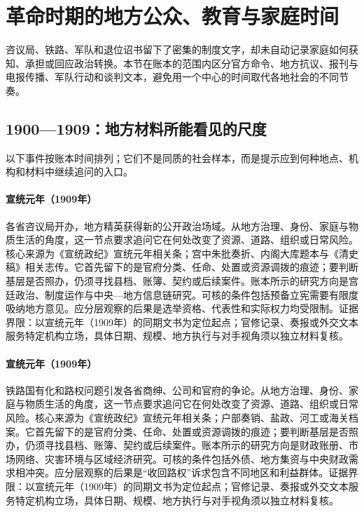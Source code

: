 \section{革命时期的地方公众、教育与家庭时间}
咨议局、铁路、军队和退位诏书留下了密集的制度文字，却未自动记录家庭如何获知、承担或回应政治转换。本节在账本的范围内区分官方命令、地方抗议、报刊与电报传播、军队行动和谈判文本，避免用一个中心的时间取代各地社会的不同节奏。
\subsection{1900—1909：地方材料所能看见的尺度}
以下事件按账本时间排列；它们不是同质的社会样本，而是提示应到何种地点、机构和材料中继续追问的入口。
\hypertarget{social:EQ-1909-PROVINCIAL-ASSEMBLIES}{}\paragraph{宣统元年（1909年）}各省咨议局开办，地方精英获得新的公开政治场域。从地方治理、身份、家庭与物质生活的角度，这一节点要求追问它在何处改变了资源、道路、组织或日常风险。核心来源为《宣统政纪》宣统元年相关条；宫中朱批奏折、内阁大库题本与《清史稿》相关志传。它首先留下的是官府分类、任命、处置或资源调拨的痕迹；要判断基层是否照办，仍须寻找县档、账簿、契约或后续案件。账本所示的研究方向是宫廷政治、制度运作与中央—地方信息链研究。可核的条件包括预备立宪需要有限度吸纳地方意见。应分层观察的后果是选举资格、代表性和实际权力均受限制。证据界限：以宣统元年（1909年）的同期文书为定位起点；官修记录、奏报或外交文本服务特定机构立场，具体日期、规模、地方执行与对手视角须以独立材料复核。
\hypertarget{social:EQ-1909-RAILWAY-RECOVERY-MOVEMENT}{}\paragraph{宣统元年（1909年）}铁路国有化和路权问题引发各省商绅、公司和官府的争论。从地方治理、身份、家庭与物质生活的角度，这一节点要求追问它在何处改变了资源、道路、组织或日常风险。核心来源为《宣统政纪》宣统元年相关条；户部奏销、盐政、河工或海关档案。它首先留下的是官府分类、任命、处置或资源调拨的痕迹；要判断基层是否照办，仍须寻找县档、账簿、契约或后续案件。账本所示的研究方向是财政账册、市场网络、灾害环境与区域经济研究。可核的条件包括外债、地方集资与中央财政需求相冲突。应分层观察的后果是“收回路权”诉求包含不同地区和利益群体。证据界限：以宣统元年（1909年）的同期文书为定位起点；官修记录、奏报或外交文本服务特定机构立场，具体日期、规模、地方执行与对手视角须以独立材料复核。

